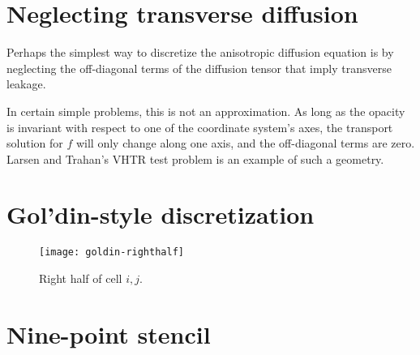 \section{Neglecting transverse diffusion}

Perhaps the simplest way to discretize the anisotropic diffusion equation is by
neglecting the off-diagonal terms of the diffusion tensor that imply transverse
leakage.

In certain simple problems, this is not an approximation. As long as the
opacity is invariant with respect to one of the coordinate system's axes, the
transport solution for $f$ will only change along one axis, and the
off-diagonal terms are zero. Larsen and Trahan's VHTR test problem
\cite{Lar2009c} is an example of such a geometry.

\section{Gol'din-style discretization}

\cite{Val2002}

\begin{figure}[htb]
  \centering
  \texttt{[image: goldin-righthalf]}
  \caption{Right half of cell $i,j$.}
  \label{fig:goldinRight}
\end{figure}

\section{Nine-point stencil}

